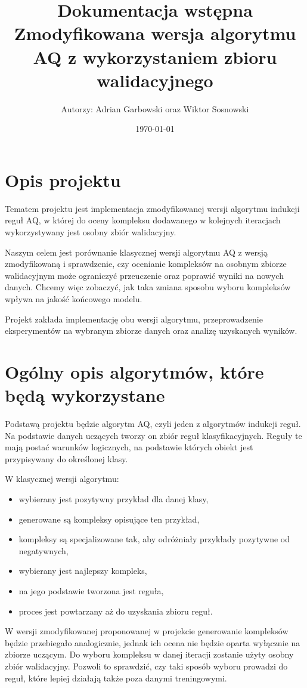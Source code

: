 \documentclass[12pt,a4paper]{article}
\title{Dokumentacja wstępna\\Zmodyfikowana wersja algorytmu AQ z wykorzystaniem zbioru walidacyjnego}
\author{Autorzy: Adrian Garbowski oraz Wiktor Sosnowski}
\date{\today}
\begin{document}
\maketitle

\section{Opis projektu}

Tematem projektu jest implementacja zmodyfikowanej wersji algorytmu indukcji reguł AQ, w której do oceny kompleksu dodawanego w kolejnych iteracjach wykorzystywany jest osobny zbiór walidacyjny.

Naszym celem jest porównanie klasycznej wersji algorytmu AQ z wersją zmodyfikowaną i sprawdzenie, czy ocenianie kompleksów na osobnym zbiorze walidacyjnym może ograniczyć przeuczenie oraz poprawić wyniki na nowych danych. Chcemy więc zobaczyć, jak taka zmiana sposobu wyboru kompleksów wpływa na jakość końcowego modelu.

Projekt zakłada implementację obu wersji algorytmu, przeprowadzenie eksperymentów na wybranym zbiorze danych oraz analizę uzyskanych wyników.

\section{Ogólny opis algorytmów, które będą wykorzystane}

Podstawą projektu będzie algorytm AQ, czyli jeden z algorytmów indukcji reguł. Na podstawie danych uczących tworzy on zbiór reguł klasyfikacyjnych. Reguły te mają postać warunków logicznych, na podstawie których obiekt jest przypisywany do określonej klasy.

W klasycznej wersji algorytmu:
\begin{itemize}
  \item wybierany jest pozytywny przykład dla danej klasy,
  \item generowane są kompleksy opisujące ten przykład,
  \item kompleksy są specjalizowane tak, aby odróżniały przykłady pozytywne od negatywnych,
  \item wybierany jest najlepszy kompleks,
  \item na jego podstawie tworzona jest reguła,
  \item proces jest powtarzany aż do uzyskania zbioru reguł.
\end{itemize}

W wersji zmodyfikowanej proponowanej w projekcie generowanie kompleksów będzie przebiegało analogicznie, jednak ich ocena nie będzie oparta wyłącznie na zbiorze uczącym. Do wyboru kompleksu w danej iteracji zostanie użyty osobny zbiór walidacyjny. Pozwoli to sprawdzić, czy taki sposób wyboru prowadzi do reguł, które lepiej działają także poza danymi treningowymi.
\end{document}
